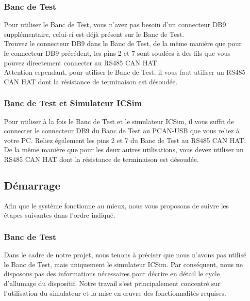 \subsubsection{Banc de Test}

Pour utiliser le Banc de Test, vous n'avez pas besoin d'un connecteur DB9 supplémentaire, celui-ci est déjà présent sur le Banc de Test.\\

Trouvez le connecteur DB9 dans le Banc de Test, de la même manière que pour le connecteur DB9 précédent, les pins 2 et 7 sont soudées à des fils que vous pouvez directement connecter au RS485 CAN HAT.\\

Attention cependant, pour utiliser le Banc de Test, il vous faut utiliser un RS485 CAN HAT dont la résistance de terminaison est désoudée.\\

\subsubsection{Banc de Test et Simulateur ICSim}

Pour utiliser à la fois le Banc de Test et le simulateur ICSim, il vous suffit de connecter le connecteur DB9 du Banc de Test au PCAN-USB que vous reliez à votre PC. Reliez également les pins 2 et 7 du Banc de Test au RS485 CAN HAT.\\

De la même manière que pour les deux autres utilisations, vous devez utiliser un RS485 CAN HAT dont la résistance de terminaison est désoudée.\\

\subsection{Démarrage}

Afin que le système fonctionne au mieux, nous vous proposons de suivre les étapes suivantes dans l'ordre indiqué.

\subsubsection{Banc de Test}

Dans le cadre de notre projet, nous tenons à préciser que nous n'avons pas utilisé le Banc de Test, mais uniquement le simulateur ICSim. Par conséquent, nous ne disposons pas des informations nécessaires pour décrire en détail le cycle d'allumage du dispositif. Notre travail s'est principalement concentré sur l'utilisation du simulateur et la mise en œuvre des fonctionnalités requises.

